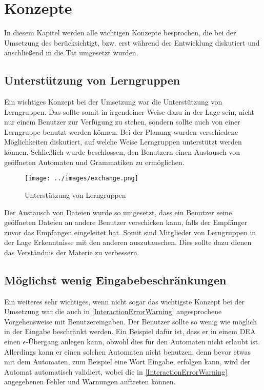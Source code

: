 

\chapter{Konzepte}\label{Concepts}

In diesem Kapitel werden alle wichtigen Konzepte besprochen, die bei der
Umsetzung des \gtitools berücksichtigt, bzw. erst während der Entwicklung
diskutiert und anschließend in die Tat umgesetzt wurden.\vspace{10pt}


\section{Unterstützung von Lerngruppen}

Ein wichtiges Konzept bei der Umsetzung war die Unterstützung von Lerngruppen.
Das \gtitool sollte somit in irgendeiner Weise dazu in der Lage sein, nicht nur
einem Benutzer zur Verfügung zu stehen, sondern sollte auch von einer
Lerngruppe benutzt werden können. Bei der Planung wurden verschiedene
Möglichkeiten diskutiert, auf welche Weise Lerngruppen unterstützt werden
können. Schließlich wurde beschlossen, den Benutzern einen Austausch von
geöffneten Automaten und Grammatiken zu ermöglichen.\vspace{10pt}

\begin{figure}[h!]
\begin{center}
\texttt{[image: ../images/exchange.png]}
\caption{Unterstützung von Lerngruppen}
\end{center}
\end{figure}

Der Austausch von Dateien wurde so umgesetzt, dass ein Benutzer seine
geöffneten Dateien an andere Benutzer verschicken kann, falls der Empfänger
zuvor das Empfangen eingeleitet hat. Somit sind Mitglieder von Lerngruppen in
der Lage Erkenntnisse mit den anderen auszutauschen. Dies sollte dazu dienen
das Verständnis der Materie zu verbessern.\vspace{10pt}


\section{Möglichst wenig Eingabebeschränkungen}

Ein weiteres sehr wichtiges, wenn nicht sogar das wichtigste Konzept bei der
Umsetzung war die auch in \ref{InteractionErrorWarning} angesprochene
Vorgehensweise mit Benutzereingaben. Der Benutzer sollte so wenig wie möglich
in der Eingabe beschränkt werden. Ein Beispiel dafür ist, dass er in einem DEA
einen $\epsilon$-Übergang anlegen kann, obwohl dies für den Automaten nicht
erlaubt ist. Allerdings kann er einen solchen Automaten nicht benutzen, denn
bevor etwas mit dem Automaten, zum Beispiel eine Wort Eingabe, erfolgen kann,
wird der Automat automatisch validiert, wobei die in
\ref{InteractionErrorWarning} angegebenen Fehler und Warnungen auftreten
können.\vspace{10pt}

